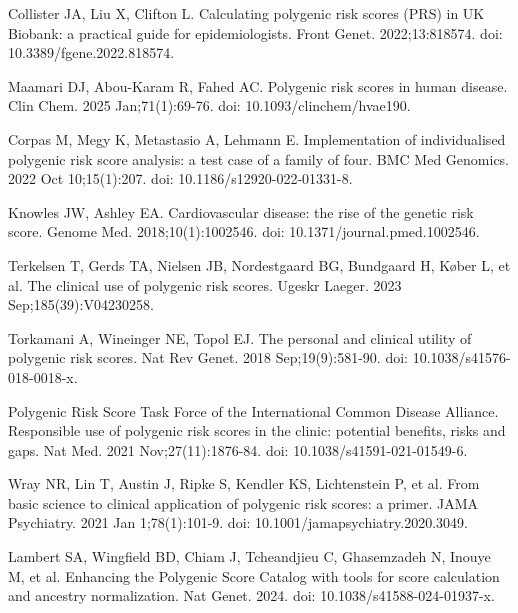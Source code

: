 \begin{thebibliography}{10}
       Collister JA, Liu X, Clifton L.
       \newblock Calculating polygenic risk scores (PRS) in UK Biobank: a practical guide for epidemiologists.
       \newblock Front Genet. 2022;13:818574. doi: 10.3389/fgene.2022.818574.

       Maamari DJ, Abou-Karam R, Fahed AC.
       \newblock Polygenic risk scores in human disease.
       \newblock Clin Chem. 2025 Jan;71(1):69-76. doi: 10.1093/clinchem/hvae190.
    
       Corpas M, Megy K, Metastasio A, Lehmann E.
       \newblock Implementation of individualised polygenic risk score analysis: a test case of a family of four.
       \newblock BMC Med Genomics. 2022 Oct 10;15(1):207. doi: 10.1186/s12920-022-01331-8.

       Knowles JW, Ashley EA.
       \newblock Cardiovascular disease: the rise of the genetic risk score.
       \newblock Genome Med. 2018;10(1):1002546. doi: 10.1371/journal.pmed.1002546.

       Terkelsen T, Gerds TA, Nielsen JB, Nordestgaard BG, Bundgaard H, Køber L, et al.
       \newblock The clinical use of polygenic risk scores.
       \newblock Ugeskr Laeger. 2023 Sep;185(39):V04230258.

       Torkamani A, Wineinger NE, Topol EJ.
       \newblock The personal and clinical utility of polygenic risk scores.
       \newblock Nat Rev Genet. 2018 Sep;19(9):581-90. doi: 10.1038/s41576-018-0018-x.

       Polygenic Risk Score Task Force of the International Common Disease Alliance.
       \newblock Responsible use of polygenic risk scores in the clinic: potential benefits, risks and gaps.
       \newblock Nat Med. 2021 Nov;27(11):1876-84. doi: 10.1038/s41591-021-01549-6.

       Wray NR, Lin T, Austin J, Ripke S, Kendler KS, Lichtenstein P, et al.
       \newblock From basic science to clinical application of polygenic risk scores: a primer.
       \newblock JAMA Psychiatry. 2021 Jan 1;78(1):101-9. doi: 10.1001/jamapsychiatry.2020.3049.

       Lambert SA, Wingfield BD, Chiam J, Tcheandjieu C, Ghasemzadeh N, Inouye M, et al.
       \newblock Enhancing the Polygenic Score Catalog with tools for score calculation and ancestry normalization.
       \newblock Nat Genet. 2024. doi: 10.1038/s41588-024-01937-x.


\end{thebibliography}
